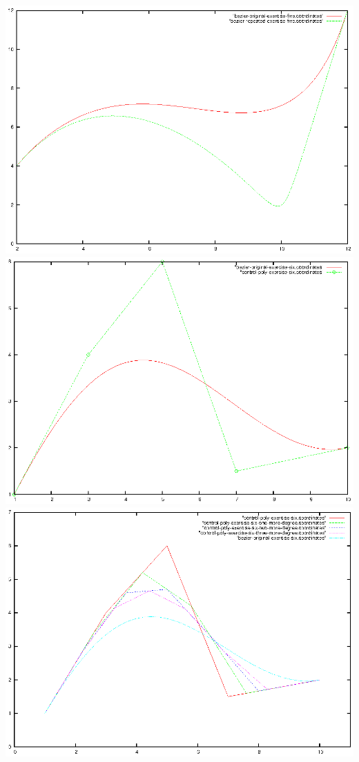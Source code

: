 \documentclass{article}
\begin{document}
\includegraphics{bezier-deCasteljau-curves/exercise-five}
\includegraphics{bezier-deCasteljau-curves/exercise-six-original}
\includegraphics{bezier-deCasteljau-curves/exercise-six-higher-degree-control-poly}
\end{document}
